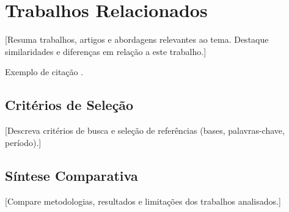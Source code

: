 \section{Trabalhos Relacionados}

[Resuma trabalhos, artigos e abordagens relevantes ao tema. Destaque similaridades e diferenças em relação a este trabalho.]

Exemplo de citação \cite{ref:exemplo}.

\subsection{Critérios de Seleção}
[Descreva critérios de busca e seleção de referências (bases, palavras-chave, período).]

\subsection{Síntese Comparativa}
[Compare metodologias, resultados e limitações dos trabalhos analisados.]
